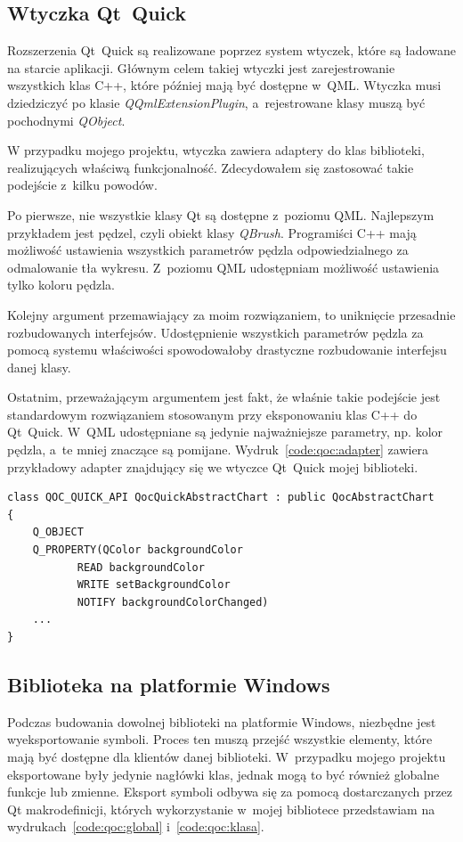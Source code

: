 \subsection{Wtyczka Qt~Quick}
Rozszerzenia Qt~Quick są realizowane poprzez system wtyczek, które są ładowane na starcie aplikacji. Głównym celem takiej wtyczki jest zarejestrowanie wszystkich klas C++, które później mają być dostępne w~QML. Wtyczka musi dziedziczyć po klasie \textit{QQmlExtensionPlugin}, a~rejestrowane klasy muszą być pochodnymi \textit{QObject}.

W przypadku mojego projektu, wtyczka zawiera adaptery do klas biblioteki, realizujących właściwą funkcjonalność. Zdecydowałem się zastosować takie podejście z~kilku powodów.

Po pierwsze, nie wszystkie klasy Qt są dostępne z~poziomu QML. Najlepszym przykładem jest pędzel, czyli obiekt klasy \textit{QBrush}. Programiści C++ mają możliwość ustawienia wszystkich parametrów pędzla odpowiedzialnego za odmalowanie tła wykresu. Z~poziomu QML udostępniam możliwość ustawienia tylko koloru pędzla.

Kolejny argument przemawiający za moim rozwiązaniem, to uniknięcie przesadnie rozbudowanych interfejsów. Udostępnienie wszystkich parametrów pędzla za pomocą systemu właściwości spowodowałoby drastyczne rozbudowanie interfejsu danej klasy.

Ostatnim, przeważającym argumentem jest fakt, że właśnie takie podejście jest standardowym rozwiązaniem stosowanym przy eksponowaniu klas C++ do Qt~Quick. W~QML udostępniane są jedynie najważniejsze parametry, np. kolor pędzla, a~te mniej znaczące są pomijane. Wydruk~\ref{code:qoc:adapter} zawiera przykładowy adapter znajdujący się we wtyczce Qt~Quick mojej biblioteki.

\begin{lstlisting}[caption=Adapter klasy QocAbstractChart, label=code:qoc:adapter]
class QOC_QUICK_API QocQuickAbstractChart : public QocAbstractChart
{
	Q_OBJECT
	Q_PROPERTY(QColor backgroundColor 
		   READ backgroundColor 
		   WRITE setBackgroundColor 
		   NOTIFY backgroundColorChanged)
	...
}
\end{lstlisting}


\subsection{Biblioteka na platformie Windows}
Podczas budowania dowolnej biblioteki na platformie Windows, niezbędne jest wyeksportowanie symboli. Proces ten muszą przejść wszystkie elementy, które mają być dostępne dla klientów danej biblioteki. W~przypadku mojego projektu eksportowane były jedynie nagłówki klas, jednak mogą to być również globalne funkcje lub zmienne. Eksport symboli odbywa się za pomocą dostarczanych przez Qt makrodefinicji, których wykorzystanie w~mojej bibliotece przedstawiam na wydrukach~\ref{code:qoc:global} i~\ref{code:qoc:klasa}.


